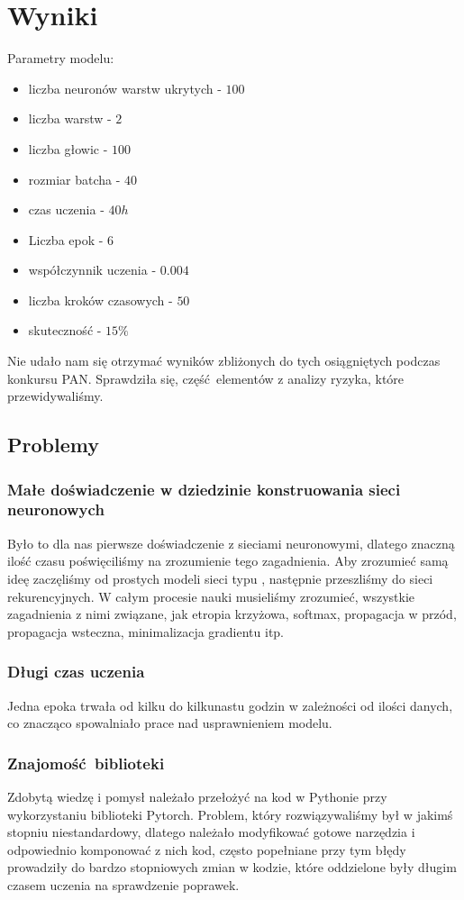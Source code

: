\newpage
\section{Wyniki}

Parametry modelu:
\begin{itemize}
	  \item liczba neuronów warstw ukrytych - $100$
	  \item liczba warstw - $2$
	  \item liczba głowic - $100$
	  \item rozmiar batcha - $40$
	  \item czas uczenia - $40h$
	  \item Liczba epok - $6$
	  \item współczynnik uczenia - $0.004$
	  \item liczba kroków czasowych - $50$
	  \item skuteczność - $15\%$
	\end{itemize}
	
Nie udało nam się otrzymać wyników zbliżonych do tych osiągniętych podczas konkursu PAN. Sprawdziła się,
część elementów z analizy ryzyka, które przewidywaliśmy.

\subsection{Problemy}
\subsubsection{Małe doświadczenie w dziedzinie konstruowania sieci neuronowych}
Było to dla nas pierwsze doświadczenie z sieciami neuronowymi, dlatego znaczną ilość czasu poświęciliśmy na 
zrozumienie tego zagadnienia. Aby zrozumieć samą ideę zaczęliśmy od prostych modeli sieci typu ,
następnie przeszliśmy do sieci rekurencyjnych. W całym procesie nauki musieliśmy zrozumieć,
wszystkie zagadnienia z nimi związane, jak etropia krzyżowa, softmax, propagacja w przód, propagacja wsteczna, 
minimalizacja gradientu itp.

\subsubsection{Długi czas uczenia}
Jedna epoka trwała od kilku do kilkunastu godzin w zależności od ilości danych, co znacząco spowalniało 
prace nad usprawnieniem modelu. 

\subsubsection{Znajomość biblioteki}
Zdobytą wiedzę i pomysł należało przełożyć na kod w Pythonie przy wykorzystaniu biblioteki Pytorch. 
Problem, który rozwiązywaliśmy był w jakimś stopniu niestandardowy, dlatego należało modyfikować 
gotowe narzędzia i odpowiednio komponować z nich kod, często popełniane przy tym błędy prowadziły 
do bardzo stopniowych zmian w kodzie, które oddzielone były długim czasem uczenia na sprawdzenie poprawek.


